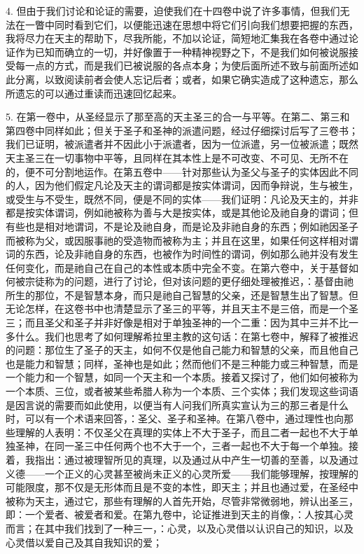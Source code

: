 4. 但由于我们讨论和论证的需要，迫使我们在十四卷中说了许多事情，但我们无法在一瞥中同时看到它们，以便能迅速在思想中将它们引向我们想要把握的东西，我将尽力在天主的帮助下，尽我所能，不加以论证，简短地汇集我在各卷中通过论证作为已知而确立的一切，并好像置于一种精神视野之下，不是我们如何被说服接受每一点的方式，而是我们已被说服的各点本身；为使后面所述不致与前面所述如此分离，以致阅读前者会使人忘记后者；或者，如果它确实造成了这种遗忘，那么所遗忘的可以通过重读而迅速回忆起来。\par

5. 在第一卷中，从圣经显示了那至高的天主圣三的合一与平等。在第二、第三和第四卷中同样如此；但关于圣子和圣神的派遣问题，经过仔细探讨后写了三卷书；我们已证明，被派遣者并不因此小于派遣者，因为一位派遣，另一位被派遣；既然天主圣三在一切事物中平等，且同样在其本性上是不可改变、不可见、无所不在的，便不可分割地运作。在第五卷中——针对那些认为圣父与圣子的实体因此不同的人，因为他们假定凡论及天主的谓词都是按实体谓词，因而争辩说，生与被生，或受生与不受生，既然不同，便是不同的实体——我们证明：凡论及天主的，并非都是按实体谓词，例如祂被称为善与大是按实体，或是其他论及祂自身的谓词；但有些也是相对地谓词，不是论及祂自身，而是论及非祂自身的东西；例如祂因圣子而被称为父，或因服事祂的受造物而被称为主；并且在这里，如果任何这样相对谓词的东西，论及非祂自身的东西，也被作为时间性的谓词，例如那么祂并没有发生任何变化，而是祂自己在自己的本性或本质中完全不变。在第六卷中，关于基督如何被宗徒称为的问题，进行了讨论，但对该问题的更仔细处理被推迟，：基督由祂所生的那位，不是智慧本身，而只是祂自己智慧的父亲，还是智慧生出了智慧。但无论怎样，在这卷书中也清楚显示了圣三的平等，并且天主不是三倍，而是一个圣三；而且圣父和圣子并非好像是相对于单独圣神的一个二重：因为其中三并不比一多什么。我们也思考了如何理解希拉里主教的这句话：在第七卷中，解释了被推迟的问题：那位生了圣子的天主，如何不仅是他自己能力和智慧的父亲，而且他自己也是能力和智慧；同样，圣神也是如此；然而他们不是三种能力或三种智慧，而是一个能力和一个智慧，如同一个天主和一个本质。接着又探讨了，他们如何被称为一个本质、三位，或者被某些希腊人称为一个本质、三个实体；我们发现这些词语是因言说的需要而如此使用，以便当有人问我们所真实宣认为三的那三者是什么时，可以有一个术语来回答，：圣父、圣子和圣神。在第八卷中，通过理性也向那些理解的人表明：不仅圣父在真理的实体上不大于圣子，而且二者一起也不大于单独圣神，在同一圣三中任何两个也不大于一个，三者一起也不大于每一个单独。接着，我指出：通过被理智所见的真理，以及通过从中产生一切善的至善，以及通过义德——一个正义的心灵甚至被尚未正义的心灵所爱——我们能够理解，按理解的可能限度，那不仅是无形体而且是不变的本性，即天主；并且也通过爱，在圣经中被称为天主，通过它，那些有理解的人首先开始，尽管非常微弱地，辨认出圣三，即：一个爱者、被爱者和爱。在第九卷中，论证推进到天主的肖像，：人按其心灵而言；在其中我们找到了一种三一，：心灵，以及心灵借以认识自己的知识，以及心灵借以爱自己及其自我知识的爱；
